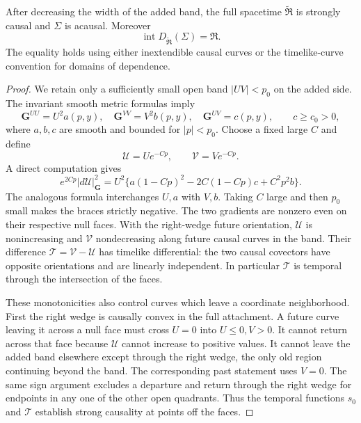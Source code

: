 \begin{lemma}\label{st:attachment-causality}
After decreasing the width of the added band, the full spacetime
$\widetilde{\mathfrak R}$ is strongly causal and $\Sigma$ is acausal.
Moreover
\begin{equation}\label{st:domain-equality}
 \operatorname{int}D_{\widetilde{\mathfrak R}}(\Sigma)=\mathfrak R.
\end{equation}
The equality holds using either inextendible causal curves or the
timelike-curve convention for domains of dependence.
\end{lemma}

\begin{proof}
We retain only a sufficiently small open band $|UV|<p_0$ on the
added side.  The invariant smooth metric formulas imply
\[
 \mathbf G^{UU}=U^2a(p,y),\quad
 \mathbf G^{VV}=V^2b(p,y),\quad
 \mathbf G^{UV}=c(p,y),\qquad c\geq c_0>0,
\]
where $a,b,c$ are smooth and bounded for $|p|<p_0$.  Choose a fixed
large $C$ and define
\begin{equation}\label{st:corrected-null-coordinates}
 \mathcal U=U e^{-Cp},\qquad \mathcal V=V e^{-Cp}.
\end{equation}
A direct computation gives
\begin{equation}\label{st:corrected-gradient}
 e^{2Cp}|d\mathcal U|_{\mathbf G}^2
 =U^2\{a(1-Cp)^2-2C(1-Cp)c+C^2p^2b\}.
\end{equation}
The analogous formula interchanges $U,a$ with $V,b$.  Taking $C$
large and then $p_0$ small makes the braces strictly negative.
The two gradients are nonzero even on their respective null faces.
With the right-wedge future orientation,
$\mathcal U$ is nonincreasing and $\mathcal V$ nondecreasing
along future causal curves in the band.  Their difference
$\mathcal T=\mathcal V-\mathcal U$ has timelike differential:
the two causal covectors have opposite orientations and are
linearly independent.  In particular $\mathcal T$ is temporal
through the intersection of the faces.

These monotonicities also control curves which leave a coordinate
neighborhood.  First the right wedge is causally convex in the full
attachment.  A future curve leaving it across a null face must cross
$U=0$ into $U\leq0,V>0$.  It cannot return across that face because
$\mathcal U$ cannot increase to positive values.  It cannot leave
the added band elsewhere except through the right wedge, the only
old region continuing beyond the band.  The corresponding past
statement uses $V=0$.  The same sign argument excludes a departure
and return through the right wedge for endpoints in any one of the
other open quadrants.  Thus the temporal functions $s_0$ and
$\mathcal T$ establish strong causality at points off the faces.


\end{proof}
